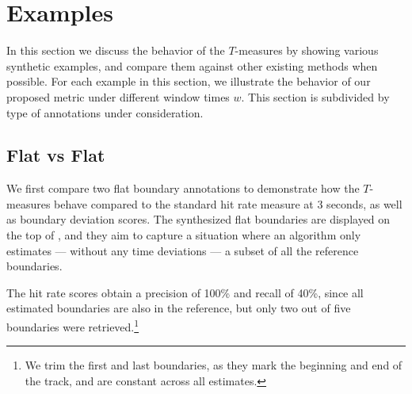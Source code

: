 \documentclass{article}
\begin{document}




\section{Examples}\label{sec:examples}

In this section we discuss the behavior of the $T$-measures by showing various synthetic examples, and compare them against other existing methods when possible.
For each example in this section, we illustrate the behavior of our proposed metric under different window times $w$.
This section is subdivided by type of annotations under consideration.

\subsection{Flat vs Flat}

We first compare two flat boundary annotations to demonstrate how the $T$-measures behave compared to the standard hit rate measure at 3 seconds, as well as boundary deviation scores.
The synthesized flat boundaries are displayed on the top of , and they aim to capture a situation where an algorithm only estimates --- without any time deviations --- a subset of all the reference boundaries.

The hit rate scores obtain a precision of 100\% and recall of 40\%, since all estimated boundaries are also 
in the reference, but only two out of five boundaries were retrieved.\footnote{We trim the first and last boundaries, as they mark the beginning and end of the track, and are constant across all estimates.}
\end{document}
